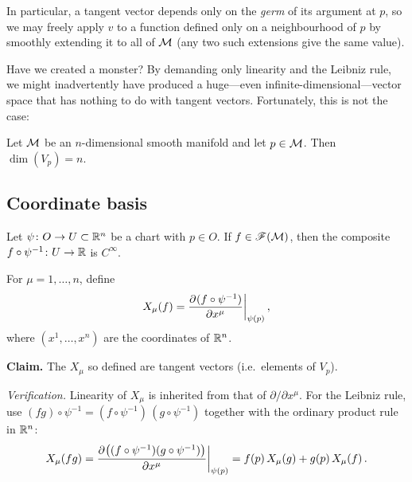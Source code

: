 In particular, a tangent vector depends only on the \emph{germ} of its
argument at $p$, so we may freely apply $v$ to a function defined only
on a neighbourhood of $p$ by smoothly extending it to all of $\mathcal{M}$
(any two such extensions give the same value).

Have we created a monster?  By demanding only linearity and the
Leibniz rule, we might inadvertently have produced a huge---even
infinite-dimensional---vector space that has nothing to do with
tangent vectors.  Fortunately, this is not the case:

\begin{theorem}\label{thm:dim-Vp}
  Let $\mathcal{M}$ be an $n$-dimensional smooth manifold and let $p\in\mathcal{M}$.
  Then $\dim(V_p) = n$.
\end{theorem}

\subsection{Coordinate basis}\label{sec:coord-basis}

Let $\psi\colon O\to U\subset\mathbb{R}^{n}$ be a chart with $p\in O$.
If $f\in\mathscr{F}(\mathcal{M})$, then the composite
$f\circ\psi^{-1}\colon U\to\mathbb{R}$ is $C^\infty$.



\begin{definition}\label{def:coord-basis}
  For $\mu = 1,\dots,n$, define
  \begin{equation}\label{eq:coord-basis}
    X_\mu(f) = \frac{\partial^{} (f\circ\psi^{-1})}{\partial {x^\mu}^{}}\bigg|_{\psi(p)}\,,
  \end{equation}
  where $(x^1,\dots,x^n)$ are the coordinates of $\mathbb{R}^{n}$.
\end{definition}

\noindent\textbf{Claim.} The $X_\mu$ so defined are tangent vectors
(i.e.\ elements of $V_p$).

\smallskip\noindent\textit{Verification.}\;
Linearity of $X_\mu$ is inherited from that of $\partial/\partial x^\mu$.
For the Leibniz rule, use
$(fg)\circ\psi^{-1} = (f\circ\psi^{-1})\,(g\circ\psi^{-1})$
together with the ordinary product rule in $\mathbb{R}^{n}$:
\[
  X_\mu(fg)
    = \frac{\partial^{} \bigl((f\circ\psi^{-1})(g\circ\psi^{-1})\bigr)}{\partial {x^\mu}^{}}\bigg|_{\psi(p)}
    = f(p)\,X_\mu(g) + g(p)\,X_\mu(f)\,.
\]

